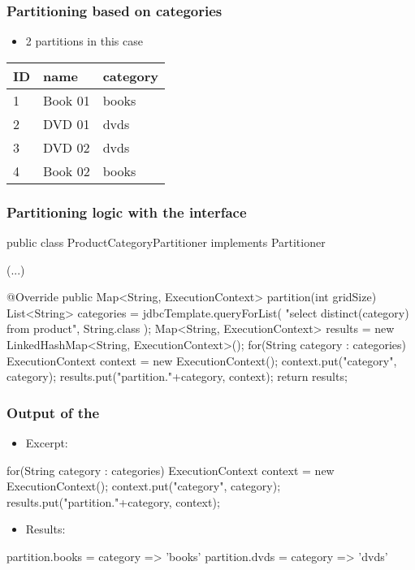 \begin{frame}
 \frametitle{Partitioning based on categories}
 \begin{itemize}
  \item 2 partitions in this case  
 \end{itemize}
 \begin{center}
 \begin{tabular}{l|l|l}
  \hline
  ID & name & category \\
  \hline
  \rowcolor{cyan}1 & Book 01 & books \\
  \rowcolor{yellow}2 & DVD 01 & dvds \\
  \rowcolor{yellow}3 & DVD 02 & dvds \\
  \rowcolor{cyan}4 & Book 02 & books \\
  \hline
 \end{tabular}
 \end{center}
\end{frame}


\begin{frame}[fragile]
\frametitle{Partitioning logic with the  interface}
\begin{javacode}
public class ProductCategoryPartitioner implements Partitioner {
  (...)

  @Override
  public Map<String, ExecutionContext> partition(int gridSize) {
    List<String> categories = jdbcTemplate.queryForList(
      "select distinct(category) from product",
      String.class
    );
    Map<String, ExecutionContext> results = 
      new LinkedHashMap<String, ExecutionContext>();
    for(String category : categories) {
      ExecutionContext context = new ExecutionContext();
      context.put("category", category);
      results.put("partition."+category, context);
    } 
    return results;
  }
}
\end{javacode}

\end{frame}

\begin{frame}[fragile]
\frametitle{Output of the }

\begin{itemize}
 \item Excerpt: 
\end{itemize}

\begin{javacode}
for(String category : categories) {
  ExecutionContext context = new ExecutionContext();
  context.put("category", category);
  results.put("partition."+category, context);
}
\end{javacode}
\begin{itemize}
 \item Results: 
\end{itemize}

\begin{textcode}
partition.books = { category => 'books' }
partition.dvds  = { category => 'dvds' }
\end{textcode}

\end{frame}

